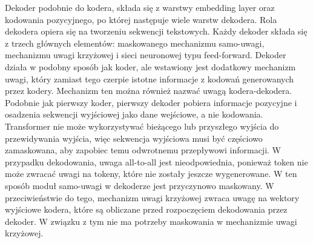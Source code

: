 Dekoder podobnie do kodera, składa się z warstwy embedding layer oraz kodowania pozycyjnego, po której następuje wiele warstw dekodera.
Rola dekodera opiera się na tworzeniu sekwencji tekstowych.
Każdy dekoder składa się z trzech głównych elementów: maskowanego mechanizmu samo-uwagi, mechanizmu uwagi krzyżowej i sieci neuronowej typu feed-forward.
Dekoder działa w podobny sposób jak koder, ale wstawiony jest dodatkowy mechanizm uwagi, który zamiast tego czerpie istotne informacje z kodowań generowanych przez kodery. 
Mechanizm ten można również nazwać uwagą kodera-dekodera.
Podobnie jak pierwszy koder, pierwszy dekoder pobiera informacje pozycyjne i osadzenia sekwencji wyjściowej jako dane wejściowe, a nie kodowania.
Transformer nie może wykorzystywać bieżącego lub przyszłego wyjścia do przewidywania wyjścia, więc sekwencja wyjściowa musi być częściowo zamaskowana, aby zapobiec temu odwrotnemu przepływowi informacji. 
W przypadku dekodowania, uwaga all-to-all jest nieodpowiednia, ponieważ token nie może zwracać uwagi na tokeny, które nie zostały jeszcze wygenerowane.
W ten sposób moduł samo-uwagi w dekoderze jest przyczynowo maskowany.
W przeciwieństwie do tego, mechanizm uwagi krzyżowej zwraca uwagę na wektory wyjściowe kodera, które są obliczane przed rozpoczęciem dekodowania przez dekoder.
W związku z tym nie ma potrzeby maskowania w mechanizmie uwagi krzyżowej.

